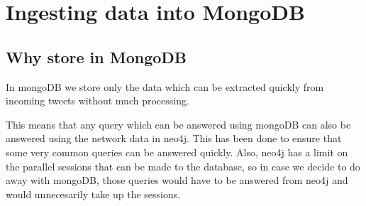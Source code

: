 \documentclass[letterpaper,10pt,english]{sphinxmanual}
\begin{document}
\chapter{Ingesting data into MongoDB}
\label{\detokenize{mongoDB_data_ingestion:ingesting-data-into-mongodb}}\label{\detokenize{mongoDB_data_ingestion::doc}}

\section{Why store in MongoDB}
\label{\detokenize{mongoDB_data_ingestion:why-store-in-mongodb}}
In mongoDB we store only the data which can be extracted quickly from incoming tweets without much processing.

This means that any query which can be answered using mongoDB can also be answered using the network data in neo4j. This has been done to ensure that some very common queries can be answered quickly. Also, neo4j has a limit on the parallel sessions that can be made to the database, so in case we decide to do away with mongoDB, those queries would have to be answered from neo4j and would unnecesarily take up the sessions.
\end{document}
